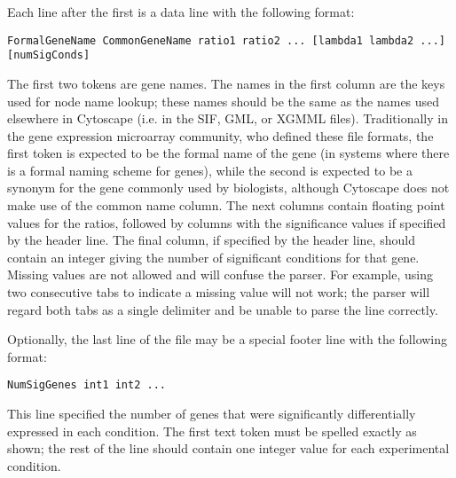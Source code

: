 Each line after the first is a data line with the following format: 
\begin{verbatim}
FormalGeneName CommonGeneName ratio1 ratio2 ... [lambda1 lambda2 ...] [numSigConds]
\end{verbatim}
The first two tokens are gene names. The names in the first column are the keys used for node name lookup; these names should be the same as the names used elsewhere in Cytoscape (i.e. in the SIF, GML, or XGMML files). Traditionally in the gene expression microarray community, who defined these file formats, the first token is expected to be the formal name of the gene (in systems where there is a formal naming scheme for genes), while the second is expected to be a synonym for the gene commonly used by biologists, although Cytoscape does not make use of the common name column. The next columns contain floating point values for the ratios, followed by columns with the significance values if specified by the header line. The final column, if specified by the header line, should contain an integer giving the number of significant conditions for that gene. Missing values are not allowed and will confuse the parser. For example, using two consecutive tabs to indicate a missing value will not work; the parser will regard both tabs as a single delimiter and be unable to parse the line correctly. 

Optionally, the last line of the file may be a special footer line with the following format: 
 \begin{verbatim}
NumSigGenes int1 int2 ...
\end{verbatim}
This line specified the number of genes that were significantly differentially expressed in each condition. The first text token must be spelled exactly as shown; the rest of the line should contain one integer value for each experimental condition. 
